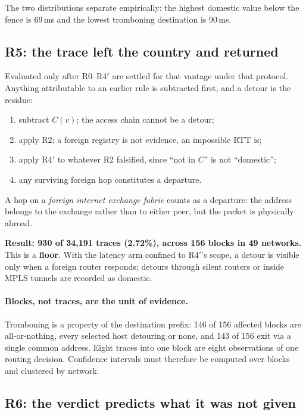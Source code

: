The two distributions separate empirically: the highest domestic value below the fence is
69\,ms and the lowest tromboning destination is 90\,ms.

\subsection{R5: the trace left the country and returned}

Evaluated only after R0--R4$'$ are settled for that vantage under that protocol. Anything
attributable to an earlier rule is subtracted first, and a detour is the residue:

\begin{enumerate}\itemsep2pt
\item subtract $C(v)$; the access chain cannot be a detour;
\item apply R2; a foreign registry is not evidence, an impossible RTT is;
\item apply R4$'$ to whatever R2 falsified, since ``not in $C$'' is not ``domestic'';
\item any surviving foreign hop constitutes a departure.
\end{enumerate}

A hop on a \emph{foreign internet exchange fabric} counts as a departure: the address
belongs to the exchange rather than to either peer, but the packet is physically abroad.

\textbf{Result: 930 of 34{,}191 traces (2.72\%), across 156 blocks in 49 networks.} This
is a \textbf{floor}. With the latency arm confined to R4$'$'s scope, a detour is visible
only when a foreign router responds; detours through silent routers or inside MPLS tunnels
are recorded as domestic.

\paragraph{Blocks, not traces, are the unit of evidence.} Tromboning is a property of the
destination prefix: 146 of 156 affected blocks are all-or-nothing, every selected host
detouring or none, and 143 of 156 exit via a single common address. Eight traces into one
block are eight observations of one routing decision. Confidence intervals must therefore
be computed over blocks and clustered by network.

\subsection{R6: the verdict predicts what it was not given}

